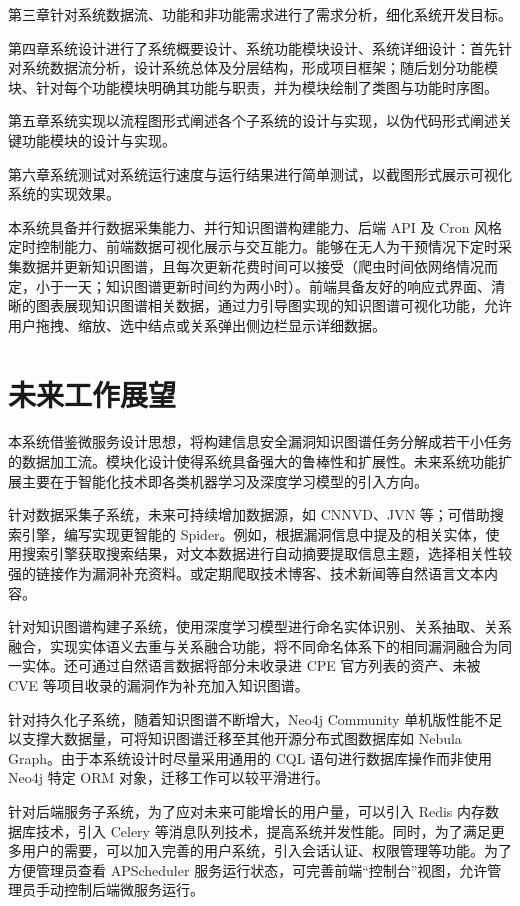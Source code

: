 \documentclass[a4paper,AutoFakeBold,oneside,12pt]{book}
\begin{document}
第三章针对系统数据流、功能和非功能需求进行了需求分析，细化系统开发目标。

第四章系统设计进行了系统概要设计、系统功能模块设计、系统详细设计：首先针对系统数据流分析，设计系统总体及分层结构，形成项目框架；随后划分功能模块、针对每个功能模块明确其功能与职责，并为模块绘制了类图与功能时序图。

第五章系统实现以流程图形式阐述各个子系统的设计与实现，以伪代码形式阐述关键功能模块的设计与实现。

第六章系统测试对系统运行速度与运行结果进行简单测试，以截图形式展示可视化系统的实现效果。

本系统具备并行数据采集能力、并行知识图谱构建能力、后端 API 及 Cron 风格定时控制能力、前端数据可视化展示与交互能力。能够在无人为干预情况下定时采集数据并更新知识图谱，且每次更新花费时间可以接受（爬虫时间依网络情况而定，小于一天；知识图谱更新时间约为两小时）。前端具备友好的响应式界面、清晰的图表展现知识图谱相关数据，通过力引导图实现的知识图谱可视化功能，允许用户拖拽、缩放、选中结点或关系弹出侧边栏显示详细数据。

\section{未来工作展望}

本系统借鉴微服务设计思想，将构建信息安全漏洞知识图谱任务分解成若干小任务的数据加工流。模块化设计使得系统具备强大的鲁棒性和扩展性。未来系统功能扩展主要在于智能化技术即各类机器学习及深度学习模型的引入方向。

针对数据采集子系统，未来可持续增加数据源，如 CNNVD、JVN 等；可借助搜索引擎，编写实现更智能的 Spider。例如，根据漏洞信息中提及的相关实体，使用搜索引擎获取搜索结果，对文本数据进行自动摘要提取信息主题，选择相关性较强的链接作为漏洞补充资料。或定期爬取技术博客、技术新闻等自然语言文本内容。

针对知识图谱构建子系统，使用深度学习模型进行命名实体识别、关系抽取、关系融合，实现实体语义去重与关系融合功能，将不同命名体系下的相同漏洞融合为同一实体。还可通过自然语言数据将部分未收录进 CPE 官方列表的资产、未被 CVE 等项目收录的漏洞作为补充加入知识图谱。

针对持久化子系统，随着知识图谱不断增大，Neo4j Community 单机版性能不足以支撑大数据量，可将知识图谱迁移至其他开源分布式图数据库如 Nebula Graph。由于本系统设计时尽量采用通用的 CQL 语句进行数据库操作而非使用 Neo4j 特定 ORM 对象，迁移工作可以较平滑进行。

针对后端服务子系统，为了应对未来可能增长的用户量，可以引入 Redis 内存数据库技术，引入 Celery 等消息队列技术，提高系统并发性能。同时，为了满足更多用户的需要，可以加入完善的用户系统，引入会话认证、权限管理等功能。为了方便管理员查看 APScheduler 服务运行状态，可完善前端``控制台''视图，允许管理员手动控制后端微服务运行。
\end{document}
